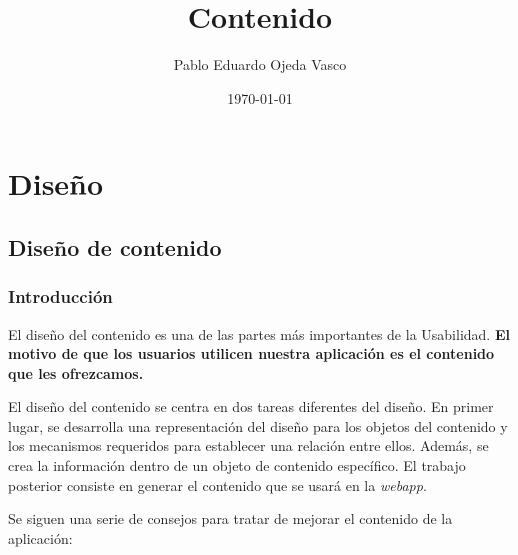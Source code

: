 \documentclass[a4paper,oneside,11pt]{book}
\begin{document}
\title{Contenido}
\author{Pablo Eduardo Ojeda Vasco}
\date{\today}



	\maketitle
%
%
\chapter{Diseño} %
	\label{sec:diseno}

	\section{Diseño de contenido} %
	\label{sec:contenido}
	
	\subsection{Introducción} %
		\label{sub:cont_introduccion}
	
		El diseño del contenido es una de las partes más importantes de la Usabilidad. \textbf{El motivo de que los usuarios utilicen nuestra aplicación es el contenido que les ofrezcamos.}
		
		El diseño del contenido se centra en dos tareas diferentes del diseño. En primer lugar, se desarrolla una representación del diseño para los objetos del contenido y los mecanismos requeridos para establecer una relación entre ellos. Además, se crea la información dentro de un objeto de contenido específico. El trabajo posterior consiste en generar el contenido que se usará en la \textit{webapp}.
		
		Se siguen una serie de consejos para tratar de mejorar el contenido de la aplicación:
\end{document}

